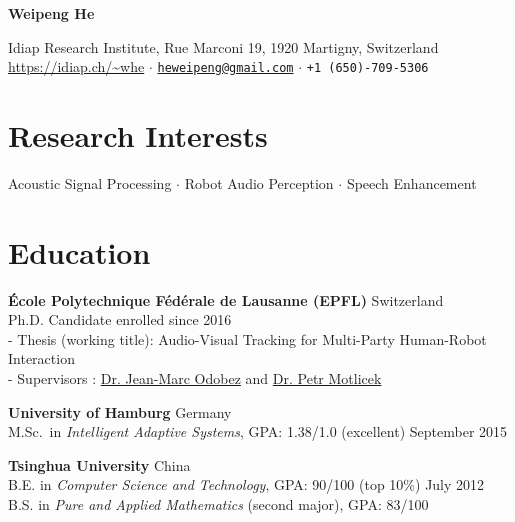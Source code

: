 \documentclass[a4paper,11pt]{article} %
\newcommand{\ind}{\hspace*{1em}}
\begin{document}
\thispagestyle{empty}


\begin{center}
  {\Huge\bfseries\sffamily Weipeng He}

  \sffamily Idiap Research Institute, Rue Marconi 19, 1920 Martigny, Switzerland \\
  \url{https://idiap.ch/~whe} $\cdotp$
  \href{mailto:heweipeng@gmail.com}{\texttt{heweipeng@gmail.com}} $\cdotp$
  \texttt{+1 (650)-709-5306}
\end{center}


\section{Research Interests}
\begin{center}
Acoustic Signal Processing $\cdotp$ Robot Audio Perception $\cdotp$ Speech Enhancement
\end{center}


\section{Education}
\textbf{\'Ecole Polytechnique F\'ed\'erale de Lausanne (EPFL)} \hfill Switzerland \\
\ind Ph.D. Candidate \hfill enrolled since 2016 \\
\ind - Thesis (working title): Audio-Visual Tracking for Multi-Party Human-Robot Interaction \\
\ind - Supervisors : \href{https://idiap.ch/~odobez}{Dr. Jean-Marc Odobez} and \href{https://people.idiap.ch/pmotlic}{Dr. Petr Motlicek}

\textbf{University of Hamburg} \hfill Germany \\
\ind M.Sc.\ in \textit{Intelligent Adaptive Systems}, GPA\@: 1.38/1.0 (excellent)  \hfill September 2015

\textbf{Tsinghua University} \hfill China \\
\ind B.E. in \textit{Computer Science and Technology}, GPA\@: 90/100 (top 10\%) \hfill July 2012 \\
\ind B.S. in \textit{Pure and Applied Mathematics} (second major), GPA\@: 83/100 %
\end{document}
